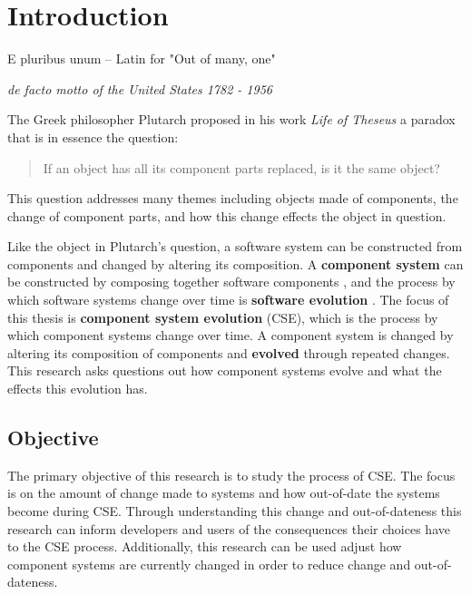 \chapter{Introduction}
\label{introduction}
\epigraph{E pluribus unum -- Latin for "Out of many, one"}
{\textit{de facto motto of the United States 1782 - 1956}}
The Greek philosopher Plutarch proposed in his work \textit{Life of Theseus} a paradox that is in essence the question:
\begin{quote}
If an object has all its component parts replaced, is it the same object?
\end{quote}
This question addresses many themes including objects made of components, the change of component parts,
and how this change effects the object in question.

Like the object in Plutarch's question, a software system can be constructed from components and changed by altering its composition.
A \textbf{component system} can be constructed by composing together software components \citep{Szyperski2002},
and the process by which software systems change over time is \textbf{software evolution} \citep{lehman1980}.
The focus of this thesis is \textbf{component system evolution} (CSE), which is the process by which component systems change over time.
A component system is changed by altering its composition of components and \textbf{evolved} through repeated changes.
This research asks questions out how component systems evolve and what the effects this evolution has.

\section{Objective}
The primary objective of this research is to study the process of CSE. 
The focus is on the amount of change made to systems and how out-of-date the systems become during CSE.
Through understanding this change and out-of-dateness
this research can inform developers and users of the consequences their choices have to the CSE process.
Additionally, this research can be used adjust how component systems are currently changed in order to reduce change and out-of-dateness.


